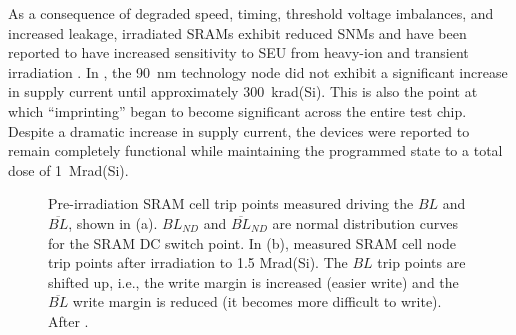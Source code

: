 As a consequence of degraded speed, timing, threshold voltage imbalances, and increased leakage, irradiated SRAMs exhibit reduced SNMs and have been reported to have increased sensitivity to SEU from heavy-ion and transient irradiation \cite{Fleetwood:1987cfa,Bhuva:1987tq,Brucker:1986fb,Yao:2008ce,Felix:2006jl}.
In \cite{Yao:2008ce}, the 90~nm technology node did not exhibit a significant increase in supply current until approximately 300~krad(Si).
This is also the point at which ``imprinting'' began to become significant across the entire test chip.
Despite a dramatic increase in supply current, the devices were reported to remain completely functional while maintaining the programmed state to a total dose of 1~Mrad(Si).

\begin{figure}[htbp]
    \begin{center}
    \end{center}
    \caption[Pre-irradiation SRAM cell trip points measured driving the $BL$ and $\overline{BL}$, shown in (a). $BL_{ND}$ and $\overline{BL}_{ND}$ are normal distribution curves for the SRAM DC switch point. In (b), measured SRAM cell node trip points after irradiation to 1.5 Mrad(Si). The $BL$ trip points are shifted up, i.e., the write margin is increased (easier write) and the $\overline{BL}$ write margin is reduced (it becomes more difficult to write).]{Pre-irradiation SRAM cell trip points measured driving the $BL$ and $\overline{BL}$, shown in (a). $BL_{ND}$ and $\overline{BL}_{ND}$ are normal distribution curves for the SRAM DC switch point. In (b), measured SRAM cell node trip points after irradiation to 1.5 Mrad(Si). The $BL$ trip points are shifted up, i.e., the write margin is increased (easier write) and the $\overline{BL}$ write margin is reduced (it becomes more difficult to write). After \cite{Yao:2008ce}.}
    \label{fig:sram_swt_pnts_yao}
\end{figure}

